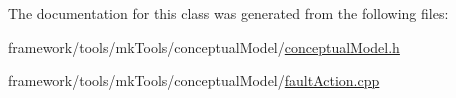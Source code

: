 The documentation for this class was generated from the following files\+:\begin{DoxyCompactItemize}
\item 
framework/tools/mk\+Tools/conceptual\+Model/\hyperlink{conceptual_model_8h}{conceptual\+Model.\+h}\item 
framework/tools/mk\+Tools/conceptual\+Model/\hyperlink{fault_action_8cpp}{fault\+Action.\+cpp}\end{DoxyCompactItemize}
